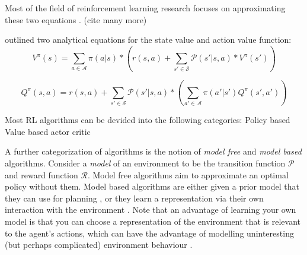 \documentclass{../main.tex}{subfiles}
\begin{document}
Most of the field of reinforcement learning research focuses on approximating these two equations \citep{Tamar2017} \citep{Watkins1992} \citep{Mnih2013}. (cite many more)

\cite{Bellman1957} outlined two analytical equations for the state value and action value function:
\begin{equation}\label{equation:bellman:state-value-function}
V^{\pi}(s) = \sum_{a \in \mathcal{A}} \pi(a | s) * (r(s, a) + \sum_{s' \in \mathcal{S}} \mathcal{P}(s' | s, a) * V^{\pi}(s'))
\end{equation}

\begin{equation}\label{equation:bellman:action-value-function}
Q^{\pi}(s, a) = r(s, a) + \sum_{s' \in \mathcal{S}} \mathcal{P}(s' | s, a) * (\sum_{a' \in \mathcal{A}} \pi(a' | s') Q^{\pi}(s', a'))
\end{equation}


Most RL algorithms can be devided into the following categories:
Policy based
Value based
actor critic

A further categorization of algorithms is the notion of \textit{model free} and \textit{model based} algorithms. Consider a \textit{model} of an environment to be the transition function $\mathcal{P}$ and reward function $\mathcal{R}$. Model free algorithms aim to approximate an optimal policy without them. Model based algorithms are either given a prior model that they can use for planning \citep{browne2012survey, Soemers2014}, or they learn a representation via their own interaction with the environment \citep{Sutton1991, Guzdial2017}. Note that an advantage of learning your own model is that you can choose a representation of the environment that is relevant to the agent's actions, which can have the advantage of modelling uninteresting (but perhaps complicated) environment behaviour \citep{Pathak2017}.
\end{document}
